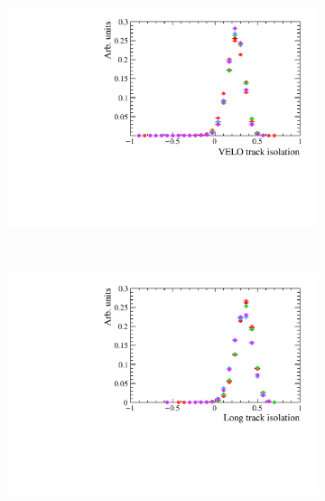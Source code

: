 \begin{figure}
 \begin{subfigure}[b]{0.48\textwidth}
        \includegraphics[width=\textwidth]{./Figs/Selection/bkgnd_iso_velo.pdf}
    \end{subfigure}
    ~ %
    \begin{subfigure}[b]{0.48\textwidth}
       \includegraphics[width=\textwidth]{./Figs/Selection/bkgnd_long_iso.pdf}
    \end{subfigure}





\end{figure}
